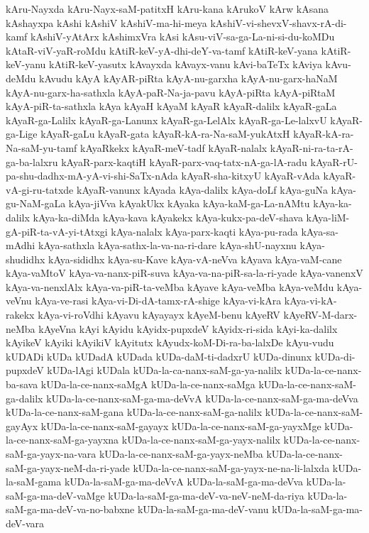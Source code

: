 {kAru-Nayxda
kAru-Nayx-saM-patitxH
kAru-kana
kArukoV
kArw
kAsana
kAshayxpa
kAshi
kAshiV
kAshiV-ma-hi-meya
kAshiV-vi-shevxV-shavx-rA-di-kamf
kAshiV-yAtArx
kAshimxVra
kAsi
kAsu-viV-sa-ga-La-ni-si-du-koMDu
kAtaR-viV-yaR-roMdu
kAtiR-keV-yA-dhi-deY-va-tamf
kAtiR-keV-yana
kAtiR-keV-yanu
kAtiR-keV-yasutx
kAvayxda
kAvayx-vanu
kAvi-baTeTx
kAviya
kAvu-deMdu
kAvudu
kAyA
kAyAR-piRta
kAyA-nu-garxha
kAyA-nu-garx-haNaM
kAyA-nu-garx-ha-sathxla
kAyA-paR-Na-ja-pavu
kAyA-piRta
kAyA-piRtaM
kAyA-piR-ta-sathxla
kAya
kAyaH
kAyaM
kAyaR
kAyaR-dalilx
kAyaR-gaLa
kAyaR-ga-Lalilx
kAyaR-ga-Lanunx
kAyaR-ga-LelAlx
kAyaR-ga-Le-lalxvU
kAyaR-ga-Lige
kAyaR-gaLu
kAyaR-gata
kAyaR-kA-ra-Na-saM-yukAtxH
kAyaR-kA-ra-Na-saM-yu-tamf
kAyaRkekx
kAyaR-meV-tadf
kAyaR-nalalx
kAyaR-ni-ra-ta-rA-ga-ba-lalxru
kAyaR-parx-kaqtiH
kAyaR-parx-vaq-tatx-nA-ga-lA-radu
kAyaR-rU-pa-shu-dadhx-mA-yA-vi-shi-SaTx-nAda
kAyaR-sha-kitxyU
kAyaR-vAda
kAyaR-vA-gi-ru-tatxde
kAyaR-vanunx
kAyada
kAya-dalilx
kAya-doLf
kAya-guNa
kAya-gu-NaM-gaLa
kAya-jiVva
kAyakUkx
kAyaka
kAya-kaM-ga-La-nAMtu
kAya-ka-dalilx
kAya-ka-diMda
kAya-kava
kAyakekx
kAya-kukx-pa-deV-shava
kAya-liM-gA-piR-ta-vA-yi-tAtxgi
kAya-nalalx
kAya-parx-kaqti
kAya-pu-rada
kAya-sa-mAdhi
kAya-sathxla
kAya-sathx-la-va-na-ri-dare
kAya-shU-nayxnu
kAya-shudidhx
kAya-sididhx
kAya-su-Kave
kAya-vA-neVva
kAyava
kAya-vaM-cane
kAya-vaMtoV
kAya-va-nanx-piR-suva
kAya-va-na-piR-sa-la-ri-yade
kAya-vanenxV
kAya-va-nenxlAlx
kAya-va-piR-ta-veMba
kAyave
kAya-veMba
kAya-veMdu
kAya-veVnu
kAya-ve-rasi
kAya-vi-Di-dA-tamx-rA-shige
kAya-vi-kAra
kAya-vi-kA-rakekx
kAya-vi-roVdhi
kAyavu
kAyayayx
kAyeM-benu
kAyeRV
kAyeRV-M-darx-neMba
kAyeVna
kAyi
kAyidu
kAyidx-pupxdeV
kAyidx-ri-sida
kAyi-ka-dalilx
kAyikeV
kAyiki
kAyikiV
kAyitutx
kAyudx-koM-Di-ra-ba-lalxDe
kAyu-vudu
kUDADi
kUDa
kUDadA
kUDada
kUDa-daM-ti-dadxrU
kUDa-dinunx
kUDa-di-pupxdeV
kUDa-lAgi
kUDala
kUDa-la-ca-nanx-saM-ga-ya-nalilx
kUDa-la-ce-nanx-ba-sava
kUDa-la-ce-nanx-saMgA
kUDa-la-ce-nanx-saMga
kUDa-la-ce-nanx-saM-ga-dalilx
kUDa-la-ce-nanx-saM-ga-ma-deVvA
kUDa-la-ce-nanx-saM-ga-ma-deVva
kUDa-la-ce-nanx-saM-gana
kUDa-la-ce-nanx-saM-ga-nalilx
kUDa-la-ce-nanx-saM-gayAyx
kUDa-la-ce-nanx-saM-gayayx
kUDa-la-ce-nanx-saM-ga-yayxMge
kUDa-la-ce-nanx-saM-ga-yayxna
kUDa-la-ce-nanx-saM-ga-yayx-nalilx
kUDa-la-ce-nanx-saM-ga-yayx-na-vara
kUDa-la-ce-nanx-saM-ga-yayx-neMba
kUDa-la-ce-nanx-saM-ga-yayx-neM-da-ri-yade
kUDa-la-ce-nanx-saM-ga-yayx-ne-na-li-lalxda
kUDa-la-saM-gama
kUDa-la-saM-ga-ma-deVvA
kUDa-la-saM-ga-ma-deVva
kUDa-la-saM-ga-ma-deV-vaMge
kUDa-la-saM-ga-ma-deV-va-neV-neM-da-riya
kUDa-la-saM-ga-ma-deV-va-no-babxne
kUDa-la-saM-ga-ma-deV-vanu
kUDa-la-saM-ga-ma-deV-vara
}
